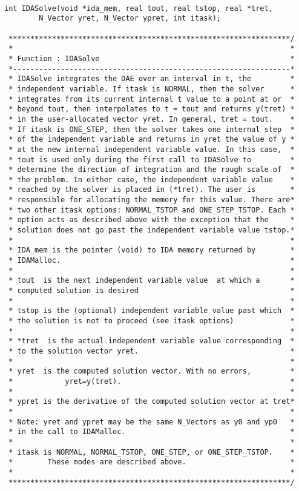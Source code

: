 \documentclass[11pt]{article}
\begin{document}
\small
\begin{verbatim}

int IDASolve(void *ida_mem, real tout, real tstop, real *tret,
        N_Vector yret, N_Vector ypret, int itask);

 *****************************************************************/
 *                                                                *
 * Function : IDASolve                                            *
 *----------------------------------------------------------------*
 * IDASolve integrates the DAE over an interval in t, the         *
 * independent variable. If itask is NORMAL, then the solver      *
 * integrates from its current internal t value to a point at or  *
 * beyond tout, then interpolates to t = tout and returns y(tret) *
 * in the user-allocated vector yret. In general, tret = tout.    *
 * If itask is ONE_STEP, then the solver takes one internal step  *
 * of the independent variable and returns in yret the value of y *
 * at the new internal independent variable value. In this case,  *
 * tout is used only during the first call to IDASolve to         *
 * determine the direction of integration and the rough scale of  *
 * the problem. In either case, the independent variable value    *
 * reached by the solver is placed in (*tret). The user is        * 
 * responsible for allocating the memory for this value. There are*
 * two other itask options: NORMAL_TSTOP and ONE_STEP_TSTOP. Each *
 * option acts as described above with the exception that the     *
 * solution does not go past the independent variable value tstop.*
 *                                                                *
 * IDA_mem is the pointer (void) to IDA memory returned by        *
 * IDAMalloc.                                                     *
 *                                                                *
 * tout  is the next independent variable value  at which a       *
 * computed solution is desired                                   *
 *                                                                *
 * tstop is the (optional) independent variable value past which  *
 * the solution is not to proceed (see itask options)             *
 *                                                                *
 * *tret  is the actual independent variable value corresponding  *
 * to the solution vector yret.                                   *
 *                                                                *
 * yret  is the computed solution vector. With no errors,         *
 *            yret=y(tret).                                       *
 *                                                                *
 * ypret is the derivative of the computed solution vector at tret*
 *                                                                *
 * Note: yret and ypret may be the same N_Vectors as y0 and yp0   *
 * in the call to IDAMalloc.                                      *
 *                                                                *
 * itask is NORMAL, NORMAL_TSTOP, ONE_STEP, or ONE_STEP_TSTOP.    *
 *        These modes are described above.                        *
 *                                                                *
 *****************************************************************/
 

\end{verbatim}
\end{document}
